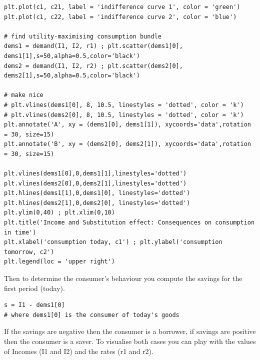 \documentclass[a4paper, 12pt, reqno]{article}
\begin{document}
\begin{lstlisting}[frame=single]
plt.plot(c1, c21, label = 'indifference curve 1', color = 'green') 
plt.plot(c1, c22, label = 'indifference curve 2', color = 'blue')

# find utility-maximising consumption bundle
dems1 = demand(I1, I2, r1) ; plt.scatter(dems1[0], dems1[1],s=50,alpha=0.5,color='black')
dems2 = demand(I1, I2, r2) ; plt.scatter(dems2[0], dems2[1],s=50,alpha=0.5,color='black')

# make nice
# plt.vlines(dems1[0], 8, 10.5, linestyles = 'dotted', color = 'k')
# plt.vlines(dems2[0], 8, 10.5, linestyles = 'dotted', color = 'k')
plt.annotate('A', xy = (dems1[0], dems1[1]), xycoords='data',rotation = 30, size=15)
plt.annotate('B', xy = (dems2[0], dems2[1]), xycoords='data',rotation = 30, size=15)

plt.vlines(dems1[0],0,dems1[1],linestyles='dotted')
plt.vlines(dems2[0],0,dems2[1],linestyles='dotted')
plt.hlines(dems1[1],0,dems1[0], linestyles='dotted')
plt.hlines(dems2[1],0,dems2[0], linestyles='dotted')
plt.ylim(0,40) ; plt.xlim(0,10)
plt.title('Income and Substitution effect: Consequences on consumption in time')
plt.xlabel('consumption today, c1') ; plt.ylabel('consumption tomorrow, c2')
plt.legend(loc = 'upper right') 

\end{lstlisting}
Then to determine the consumer's behaviour you compute the savings for the first period (today). 
\begin{lstlisting}[frame=single]
s = I1 - dems1[0]
# where dems1[0] is the consumer of today's goods
\end{lstlisting}  
If the savings are negative then the consumer is a borrower, if savings are positive then the consumer is a saver. 
To visualise both cases you can play with the values of Incomes (I1 and I2) and the rates (r1 and r2).  
\end{document}
